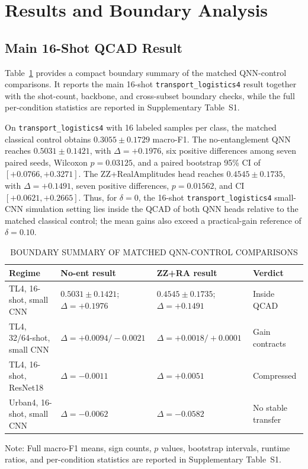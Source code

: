\documentclass[journal]{IEEEtran}
\newcommand{\TL}{\texttt{transport\_logistics4}}
\begin{document}
\section{Results and Boundary Analysis}
\subsection{Main 16-Shot QCAD Result}
Table~\ref{tab:boundary_summary} provides a compact boundary summary of the matched QNN-control comparisons. It reports the main 16-shot \TL{} result together with the shot-count, backbone, and cross-subset boundary checks, while the full per-condition statistics are reported in Supplementary Table~S1.

On \TL{} with 16 labeled samples per class, the matched classical control obtains $0.3055\pm0.1729$ macro-F1. The no-entanglement QNN reaches $0.5031\pm0.1421$, with $\Delta=+0.1976$, six positive differences among seven paired seeds, Wilcoxon $p=0.03125$, and a paired bootstrap 95\% CI of $[+0.0766,+0.3271]$. The ZZ+RealAmplitudes head reaches $0.4545\pm0.1735$, with $\Delta=+0.1491$, seven positive differences, $p=0.01562$, and CI $[+0.0621,+0.2665]$. Thus, for $\delta=0$, the 16-shot \TL{} small-CNN simulation setting lies inside the QCAD of both QNN heads relative to the matched classical control; the mean gains also exceed a practical-gain reference of $\delta=0.10$.

\begin{table}[!t]
\caption{BOUNDARY SUMMARY OF MATCHED QNN-CONTROL COMPARISONS}
\label{tab:boundary_summary}
\centering
\scriptsize
\setlength{\tabcolsep}{3pt}
\renewcommand{\arraystretch}{1.08}
\begin{tabular}{@{}p{}p{}p{}p{}@{}}
\toprule
Regime & No-ent result & ZZ+RA result & Verdict \\
\midrule
TL4, 16-shot, small CNN & $0.5031\pm0.1421$; $\Delta=+0.1976$ & $0.4545\pm0.1735$; $\Delta=+0.1491$ & Inside QCAD \\
TL4, 32/64-shot, small CNN & $\Delta=+0.0094/-0.0021$ & $\Delta=+0.0018/+0.0001$ & Gain contracts \\
TL4, 16-shot, ResNet18 & $\Delta=-0.0011$ & $\Delta=+0.0051$ & Compressed \\
Urban4, 16-shot, small CNN & $\Delta=-0.0062$ & $\Delta=-0.0582$ & No stable transfer \\
\bottomrule
\end{tabular}
\vspace{1pt}
\parbox{0.92\textwidth}{\footnotesize Note: Full macro-F1 means, sign counts, $p$ values, bootstrap intervals, runtime ratios, and per-condition statistics are reported in Supplementary Table~S1.}
\end{table}
\end{document}

